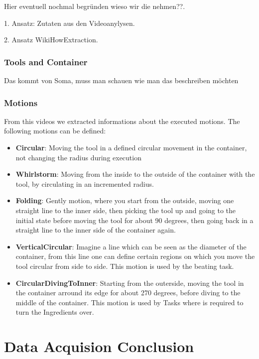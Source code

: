 Hier eventuell nochmal begründen wieso wir die nehmen??.

1. Ansatz: Zutaten aus den Videoanylysen.

2. Ansatz WikiHowExtraction.

\subsubsection*{Tools and Container}
Das kommt von Soma, muss man schauen wie man das beschreiben möchten

\subsubsection*{Motions}
	From this videos we extracted informations about the executed motions. The following motions can be defined:
	\begin{itemize}
		\item \textbf{Circular}: Moving the tool in a defined circular movement in the container, not changing the radius during execution
		\item \textbf{Whirlstorm}: Moving from the inside to the outside of the container with the tool, by circulating in an incremented radius.
		\item \textbf{Folding}: Gently motion, where you start from the outside, moving one straight line to the inner side, then picking the tool up and going to the initial state before moving the tool for about 90 degrees, then going back in a straight line to the inner side of the container again.
		\item \textbf{VerticalCircular}: Imagine a line which can be seen as the diameter of the container, from this line one can define certain regions on which you move the tool circular from side to side. This motion is used by the beating task.
		\item \textbf{CircularDivingToInner}: Starting from the outerside, moving the tool in the container arround its edge for about 270 degrees, before diving to the middle of the container. This motion is used by Tasks where is required to turn the Ingredients over.
	\end{itemize}

\section*{Data Acquision Conclusion}

